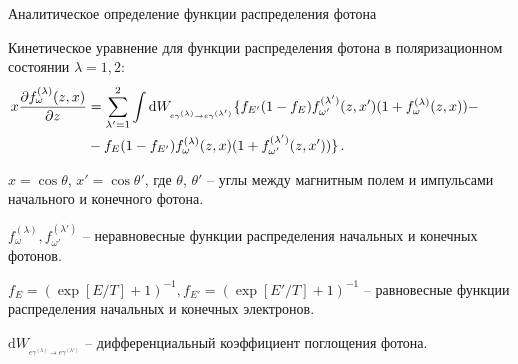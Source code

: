 \documentclass{beamer}
\newcommand{\dd}{\mathrm{d}}
\begin{document}
\begin{frame}{ \small Аналитическое определение функции распределения фотона}
	
	Кинетическое уравнение для функции распределения фотона в поляризационном состоянии $\lambda=1,2$:
	\vspace{-1mm}
	\begin{equation}\nonumber
		\hspace{-8mm}\begin{aligned}\label{Kineq:Gen}
			x\frac{\partial f^{(\lambda)}_\omega(z,x)}{\partial z}&=\sum_{\lambda'=1}^{2} \int \dd W_{_{e\gamma^{(\lambda)} \to e\gamma^{(\lambda')} }}\{f_{E'}(1-f_E)f^{(\lambda')}_{\omega'}(z, x') (1+f_\omega^{(\lambda)}(z, x))-
			\\
			&-f_E (1-f_{E'}) f_\omega^{(\lambda)}(z,x)(1+f_{\omega'}^{(\lambda')}(z, x'))
			\}\, .
		\end{aligned}
	\end{equation}
	
	\hspace{5mm}$x=\cos\theta$, $x'=\cos\theta'$, где $\theta$, $\theta'$ -- углы между магнитным полем и импульсами начального и конечного фотона.
		
	\hspace{5mm}$f_\omega^{(\lambda)}, f_{\omega'}^{(\lambda')}$ -- 
	неравновесные функции распределения начальных и конечных фотонов.
	
	\hspace{5mm} $f_E=(\exp[E/T]+1)^{-1}, f_{E'}=(\exp[E'/T]+1)^{-1}$ -- равновесные функции распределения начальных и конечных электронов.
	
	\hspace{5mm}$\dd W_{_{e\gamma^{(\lambda)} \to e\gamma^{(\lambda')} }}$ --  дифференциальный коэффициент поглощения фотона. 
	
\end{frame}
\end{document}

